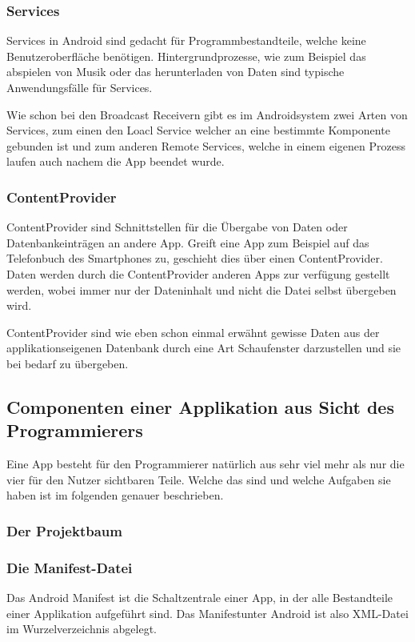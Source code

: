 \subsubsection{Services} \label{Services aus Nutzersicht}
Services in Android sind gedacht f\"ur Programmbestandteile, welche keine Benutzeroberfl\"ache ben\"otigen. Hintergrundprozesse, wie zum Beispiel das abspielen von Musik oder das herunterladen von Daten sind typische Anwendungsf\"alle f\"ur Services. 

Wie schon bei den Broadcast Receivern gibt es im Androidsystem zwei Arten von Services, zum einen den Loacl Service welcher an eine bestimmte Komponente gebunden ist und zum anderen Remote Services, welche in einem eigenen Prozess laufen auch nachem die App beendet wurde.

\subsubsection{ContentProvider} \label{ContentProvider aus Nutzersicht}
ContentProvider sind Schnittstellen f\"ur die \"Ubergabe von Daten oder Datenbankeintr\"agen an andere App.
Greift eine App zum Beispiel auf das Telefonbuch des Smartphones zu, geschieht dies \"uber einen ContentProvider. Daten werden durch die ContentProvider anderen Apps zur verf\"ugung gestellt werden, wobei immer nur der Dateninhalt und nicht die Datei selbst \"ubergeben wird. \cite{Kuehn12}

ContentProvider sind wie eben schon einmal erw\"ahnt gewisse Daten aus der applikationseigenen Datenbank durch eine Art Schaufenster darzustellen und sie bei bedarf zu \"ubergeben.

\subsection{Componenten einer Applikation aus Sicht des Programmierers}
Eine App besteht f\"ur den Programmierer nat\"urlich aus sehr viel mehr als nur die vier f\"ur den Nutzer sichtbaren Teile. Welche das sind und welche Aufgaben sie haben ist im folgenden genauer beschrieben. \cite{GolemHBAppAusEntwicklerSicht}

\subsubsection{Der Projektbaum}
\cite{GolemHBRessourcen}

\subsubsection{Die Manifest-Datei} \label{Die Manifest-Datei}
Das Android Manifest ist die Schaltzentrale einer App, in der alle Bestandteile einer Applikation aufgef\"uhrt sind. Das Manifestunter Android ist also XML-Datei im Wurzelverzeichnis abgelegt. 

